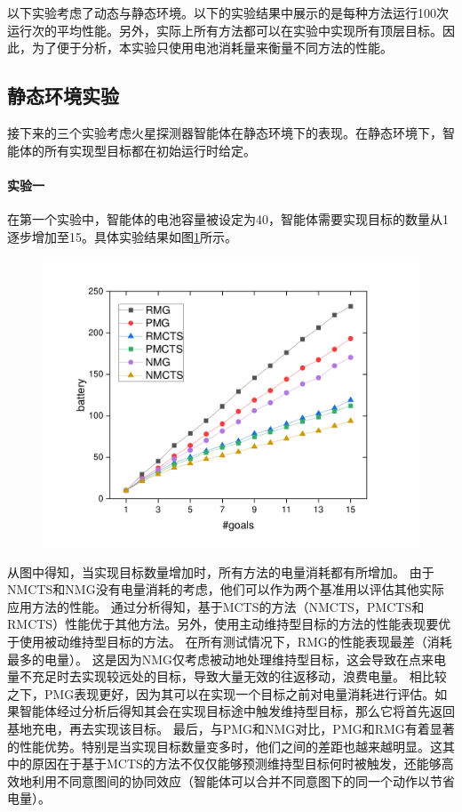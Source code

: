 以下实验考虑了动态与静态环境。以下的实验结果中展示的是每种方法运行100次运行次的平均性能。另外，实际上所有方法都可以在实验中实现所有顶层目标。因此，为了便于分析，本实验只使用电池消耗量来衡量不同方法的性能。
\subsection{静态环境实验}
接下来的三个实验考虑火星探测器智能体在静态环境下的表现。在静态环境下，智能体的所有实现型目标都在初始运行时给定。
\paragraph{实验一}
在第一个实验中，智能体的电池容量被设定为40，智能体需要实现目标的数量从1逐步增加至15。具体实验结果如图\ref{fig:static1}所示。
\begin{figure}[!h]
\centering
\includegraphics[scale=0.4]{./figs/gX_cY_fixCap40.pdf}
\captionsetup{justification=centering}
\label{fig:static1}
\end{figure}

从图中得知，当实现目标数量增加时，所有方法的电量消耗都有所增加。
由于NMCTS和NMG没有电量消耗的考虑，他们可以作为两个基准用以评估其他实际应用方法的性能。
通过分析得知，基于MCTS的方法（NMCTS，PMCTS和RMCTS）性能优于其他方法。另外，使用主动维持型目标的方法的性能表现要优于使用被动维持型目标的方法。
在所有测试情况下，RMG的性能表现最差（消耗最多的电量）。
这是因为NMG仅考虑被动地处理维持型目标，这会导致在点来电量不充足时去实现较远处的目标，导致大量无效的往返移动，浪费电量。
相比较之下，PMG表现更好，因为其可以在实现一个目标之前对电量消耗进行评估。如果智能体经过分析后得知其会在实现目标途中触发维持型目标，那么它将首先返回基地充电，再去实现该目标。
最后，与PMG和NMG对比，PMG和RMG有着显著的性能优势。特别是当实现目标数量变多时，他们之间的差距也越来越明显。这其中的原因在于基于MCTS的方法不仅仅能够预测维持型目标何时被触发，还能够高效地利用不同意图间的协同效应（智能体可以合并不同意图下的同一个动作以节省电量）。


